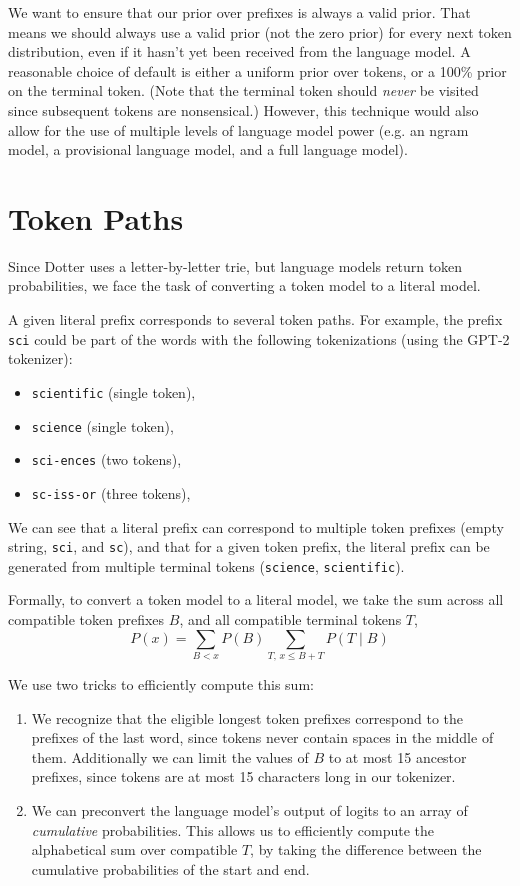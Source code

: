 We want to ensure that our prior over prefixes is always a valid prior.
That means we should always use a valid prior (not the zero prior) for every next token distribution,
even if it hasn't yet been received from the language model.
A reasonable choice of default is either a uniform prior over tokens, or a 100\% prior on the terminal token.
(Note that the terminal token should \textit{never} be visited since subsequent tokens are nonsensical.)
However, this technique would also allow for the use of multiple levels of language model power (e.g. an ngram model, a provisional language model, and a full language model).

\section{Token Paths}
Since Dotter uses a letter-by-letter trie, but language models return token probabilities,
we face the task of converting a token model to a literal model.

A given literal prefix corresponds to several token paths.
For example, the prefix \texttt{sci} could be part of the words with the following
tokenizations (using the GPT-2 tokenizer):
\begin{itemize}
    \item \texttt{scientific} (single token),
    \item \texttt{science} (single token),
    \item \texttt{sci-ences} (two tokens),
    \item \texttt{sc-iss-or} (three tokens),
\end{itemize}
We can see that a literal prefix can correspond to multiple 
token prefixes (empty string, \texttt{sci}, and \texttt{sc}), and that for a given token prefix, the literal prefix
can be generated from multiple terminal tokens (\texttt{science}, \texttt{scientific}).

Formally, to convert a token model to a literal model, we take the sum across 
all compatible token prefixes $B$, and all compatible terminal tokens $T$,
$$
P(x) = \sum_{B < x} P(B) \sum_{T,\, x \leq B+T} P(T \mid B)
$$

We use two tricks to efficiently compute this sum:
\begin{enumerate}
    \item We recognize that the eligible longest token prefixes correspond to the prefixes of the last word, since tokens never contain spaces in the middle of them.
    Additionally we can limit the values of $B$ to at most 15 ancestor prefixes, since tokens are at most 15 characters long in our tokenizer.
    \item We can preconvert the language model's output of logits to an array of \textit{cumulative} probabilities.
    This allows us to efficiently compute the alphabetical sum over compatible $T$, by taking the difference between the cumulative probabilities of the start and end.
\end{enumerate}



